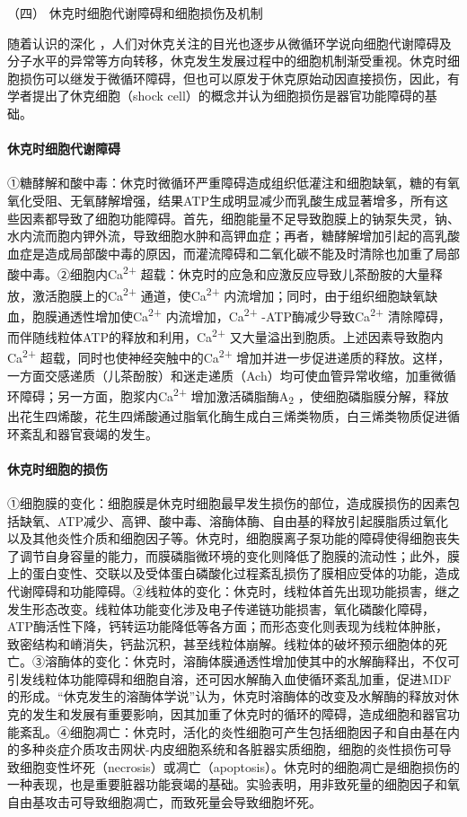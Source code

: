\hypertarget{text00055.htmlux5cux23CHP2-1-1-2-4}{}
（四） 休克时细胞代谢障碍和细胞损伤及机制

随着认识的深化
，人们对休克关注的目光也逐步从微循环学说向细胞代谢障碍及分子水平的异常等方向转移，休克发生发展过程中的细胞机制渐受重视。休克时细胞损伤可以继发于微循环障碍，但也可以原发于休克原始动因直接损伤，因此，有学者提出了休克细胞（shock
cell）的概念并认为细胞损伤是器官功能障碍的基础。

\paragraph{休克时细胞代谢障碍}

①糖酵解和酸中毒：休克时微循环严重障碍造成组织低灌注和细胞缺氧，糖的有氧氧化受阻、无氧酵解增强，结果ATP生成明显减少而乳酸生成显著增多，所有这些因素都导致了细胞功能障碍。首先，细胞能量不足导致胞膜上的钠泵失灵，钠、水内流而胞内钾外流，导致细胞水肿和高钾血症；再者，糖酵解增加引起的高乳酸血症是造成局部酸中毒的原因，而灌流障碍和二氧化碳不能及时清除也加重了局部酸中毒。②细胞内Ca\textsuperscript{2+}
超载：休克时的应急和应激反应导致儿茶酚胺的大量释放，激活胞膜上的Ca\textsuperscript{2+}
通道，使Ca\textsuperscript{2+}
内流增加；同时，由于组织细胞缺氧缺血，胞膜通透性增加使Ca\textsuperscript{2+}
内流增加，Ca\textsuperscript{2+} -ATP酶减少导致Ca\textsuperscript{2+}
清除障碍，而伴随线粒体ATP的释放和利用，Ca\textsuperscript{2+}
又大量溢出到胞质。上述因素导致胞内Ca\textsuperscript{2+}
超载，同时也使神经突触中的Ca\textsuperscript{2+}
增加并进一步促进递质的释放。这样，一方面交感递质（儿茶酚胺）和迷走递质（Ach）均可使血管异常收缩，加重微循环障碍；另一方面，胞浆内Ca\textsuperscript{2+}
增加激活磷脂酶A\textsubscript{2}
，使细胞磷脂膜分解，释放出花生四烯酸，花生四烯酸通过脂氧化酶生成白三烯类物质，白三烯类物质促进循环紊乱和器官衰竭的发生。

\paragraph{休克时细胞的损伤}

①细胞膜的变化：细胞膜是休克时细胞最早发生损伤的部位，造成膜损伤的因素包括缺氧、ATP减少、高钾、酸中毒、溶酶体酶、自由基的释放引起膜脂质过氧化以及其他炎性介质和细胞因子等。休克时，细胞膜离子泵功能的障碍使得细胞丧失了调节自身容量的能力，而膜磷脂微环境的变化则降低了胞膜的流动性；此外，膜上的蛋白变性、交联以及受体蛋白磷酸化过程紊乱损伤了膜相应受体的功能，造成代谢障碍和功能障碍。②线粒体的变化：休克时，线粒体首先出现功能损害，继之发生形态改变。线粒体功能变化涉及电子传递链功能损害，氧化磷酸化障碍，ATP酶活性下降，钙转运功能降低等各方面；而形态变化则表现为线粒体肿胀，致密结构和嵴消失，钙盐沉积，甚至线粒体崩解。线粒体的破坏预示细胞体的死亡。③溶酶体的变化：休克时，溶酶体膜通透性增加使其中的水解酶释出，不仅可引发线粒体功能障碍和细胞自溶，还可因水解酶入血使循环紊乱加重，促进MDF的形成。“休克发生的溶酶体学说”认为，休克时溶酶体的改变及水解酶的释放对休克的发生和发展有重要影响，因其加重了休克时的循环的障碍，造成细胞和器官功能紊乱。④细胞凋亡：休克时，活化的炎性细胞可产生包括细胞因子和自由基在内的多种炎症介质攻击网状-内皮细胞系统和各脏器实质细胞，细胞的炎性损伤可导致细胞变性坏死（necrosis）或凋亡（apoptosis）。休克时的细胞凋亡是细胞损伤的一种表现，也是重要脏器功能衰竭的基础。实验表明，用非致死量的细胞因子和氧自由基攻击可导致细胞凋亡，而致死量会导致细胞坏死。

